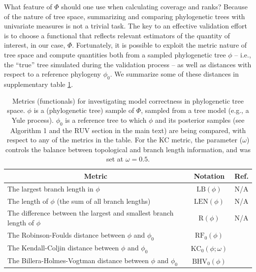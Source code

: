\documentclass[oneside]{article}
\begin{document}
What feature of $\Phi$ should one use when calculating coverage and ranks?
Because of the nature of tree space, summarizing and comparing phylogenetic trees with univariate measures is not a trivial task.
The key to an effective validation effort is to choose a functional that reflects relevant estimators of the quantity of interest, in our case, $\Phi$.
Fortunately, it is possible to exploit the metric nature of tree space and compute quantities both from a sampled phylogenetic tree $\phi$ -- i.e., the ``true'' tree simulated during the validation process -- as well as distances with respect to a reference phylogeny $\phi_0$.
We summarize some of these distances in supplementary table \ref{suptab:dists}.

\begin{table}[h]
  \caption{Metrics (functionals) for investigating model correctness in phylogenetic tree space. $\phi$ is a (phylogenetic tree) sample of $\Phi$, sampled from a tree model (e.g., a Yule process).
  $\phi_0$ is a reference tree to which $\phi$ and its posterior samples (see Algorithm 1 and the RUV section in the main text) are being compared, with respect to any of the metrics in the table.
  For the KC metric, the parameter ($\omega$) controls the balance between topological and branch length information, and was set at $\omega = 0.5$. }
  \label{suptab:dists}
  \centering
  \begin{tabular}{ l|c|c }
    \hline
    \multicolumn{1}{c|}{Metric} & Notation & Ref. \\
    \hline  
    \rowcolor{gray!10}The largest branch length in $\phi$ & $\text{LB}(\phi)$ & N/A\\
    The length of $\phi$ (the sum of all branch lengths) & $\text{LEN}(\phi)$ & N/A\\
    \rowcolor{gray!10}The difference between the largest and smallest branch length of $\phi$ & $\text{R}(\phi)$ & N/A\\
    The Robinson-Foulds distance between $\phi$ and $\phi_0$ & $\text{RF}_0(\phi)$ & \citep{foulds81}\\
    \rowcolor{gray!10}The Kendall-Coljin distance between $\phi$ and $\phi_0$ & $\text{KC}_0(\phi;\omega)$ & \citep{Kendall2016}\\
    The Billera-Holmes-Vogtman distance between $\phi$ and $\phi_0$ & $\text{BHV}_0(\phi)$ & \citep{Billera2001}\\
    \hline
  \end{tabular}
\end{table}
\end{document}
